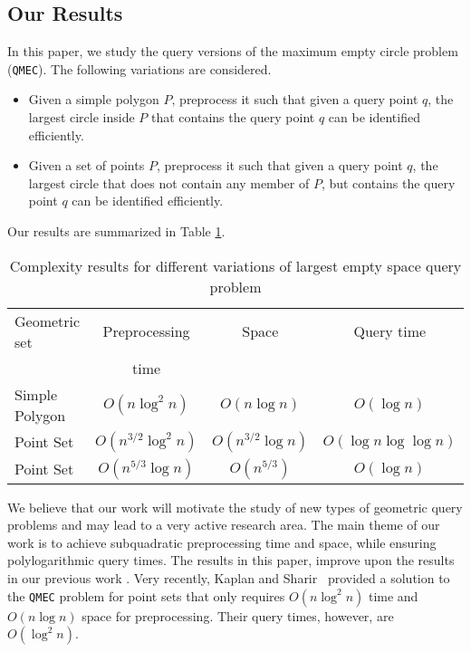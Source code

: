 \documentclass[12pt]{llncs}
\begin{document}
\subsection{Our Results}
In this paper, we  study the query versions of the maximum empty circle  problem ({\tt QMEC}).  
The following variations are considered. 
\begin{itemize}
\item Given a simple polygon $P$, preprocess it 
such that given a query point $q$, the largest circle inside $P$ 
that contains the query point $q$ can be identified efficiently.
\item Given a set of points $P$, preprocess it such 
that given a query point $q$, the largest circle that does not contain 
any member of $P$, but contains the query point $q$ can be identified 
efficiently.
\end{itemize}
Our results are summarized in Table 
\ref{TAB1}.
\begin{table} \caption{Complexity results for different variations 
of largest empty space query problem}
\begin{center}
\begin{tabular}{|l|c|c|c|} \hline 
Geometric set  & Preprocessing & Space & Query
time \\ 
&  time  &  & \\ \hline 
Simple Polygon &  $O(n \log^2 n)$ & $O(n \log n)$ & 
$O(\log n)$ \\ \hline 
Point Set &  $O(n^{3/2} \log^2 n)$ & $O(n^{3/2} \log n)$ & $O(\log 
n\log\log n)$ 
\\ \hline
Point Set &  $O(n^{5/3} \log n)$ & $O(n^{5/3})$ & $O(\log 
n)$ 
\\ \hline
\end{tabular}
\end{center}
\label{TAB1}
\vspace{-0.15in}
\end{table}

We believe that our work will motivate the study of new types of geometric 
query problems and may lead to a very active research area. The main 
theme of our work is to achieve  subquadratic preprocessing time and space, while ensuring 
polylogarithmic query times. 
The results in this paper, improve upon the results in our previous 
work  \cite{ADMNRS10}. Very recently, Kaplan and Sharir\ \cite{KS12} provided a solution to the {\tt QMEC} problem for point sets that only requires $O(n \log^2 n)$ time and $O(n \log n)$ space for preprocessing. Their query times, however, are $O(\log^2 n)$.
\end{document}
